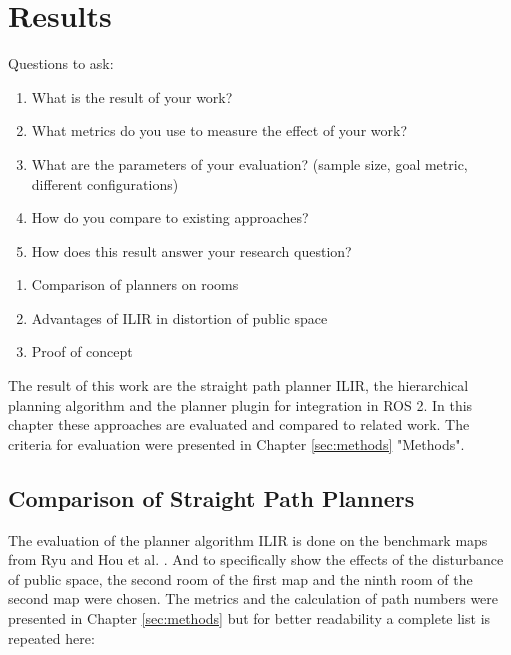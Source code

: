 \chapter{Results}
\label{sec:results}
Questions to ask:
\begin{enumerate}
    \item What is the result of your work?
    \item What metrics do you use to measure the effect of your work?
    \item What are the parameters of your evaluation? (sample size, goal metric, different configurations)
    \item How do you compare to existing approaches?
    \item How does this result answer your research question?
\end{enumerate}

\begin{enumerate}
    \item Comparison of planners on rooms
    \item Advantages of ILIR in distortion of public space
    \item Proof of concept 
\end{enumerate}

The result of this work are the straight path planner ILIR, the hierarchical planning algorithm and the planner plugin for integration in ROS 2. In this chapter these approaches are evaluated and compared to related work. The criteria for evaluation were presented in Chapter \ref{sec:methods} "Methods".

\section{Comparison of Straight Path Planners}
\label{sec:evaluation_straight_path}
The evaluation of the planner algorithm ILIR is done on the benchmark maps from Ryu \cite{ryu_hierarchical_2020} and Hou et al. \cite{hou_straight_2021}. And to specifically show the effects of the disturbance of public space, the second room of the first map and the ninth room of the second map were chosen. The metrics and the calculation of path numbers were presented in Chapter \ref{sec:methods} but for better readability a complete list is repeated here:

